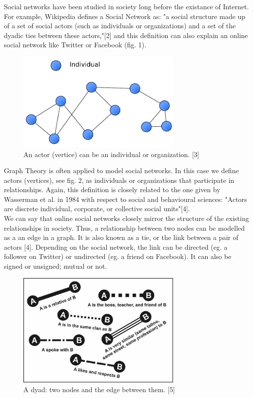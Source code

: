 \documentclass[conference,letterpaper]{IEEEtran}
\begin{document}
\indent
Social networks have been studied in society long before the existance of Internet. For example, Wikipedia defines a Social Network as: "a social structure made up of a set of social actors (such as
individuals or organizations) and a set of the dyadic ties between these actors,"[2] and this definition can also explain an online social network like Twitter or Facebook (fig. 1).\\

\begin{center}
\begin{figure}[hb]
\centering
\includegraphics[width=3.2in]{social-network}
\caption{
An actor (vertice) can be an individual or organization. [3]
}
\label{fig_sim}
\end{figure}
\end{center}

Graph Theory is often applied to model social networks. In this case we define actors (vertices), see fig. 2,  as individuals or organizations that participate in relationships. Again, this definition is closely related to the one given by Wasserman et al. in 1984 with respect to social and behavioural sciences: "Actors are discrete individual, corporate, or collective social units"[4]. \\
We can say that online social networks closely mirror the structure of the existing relationships in society. Thus, a relationship between two nodes can be modelled as a an edge in a graph. It is also known as a tie, or the link between a pair of actors [4]. Depending on the social network, the link can be directed (eg. a follower on Twitter) or undirected (eg. a friend on Facebook). It can also be signed or unsigned; mutual or not. \\
\begin{center}
\begin{figure}[hb]
\centering
\includegraphics[width=3.2in]{f03}
\caption{
A dyad: two nodes and the edge between them. [5]
}
\label{fig_sim}
\end{figure}
\end{center}
\end{document}
